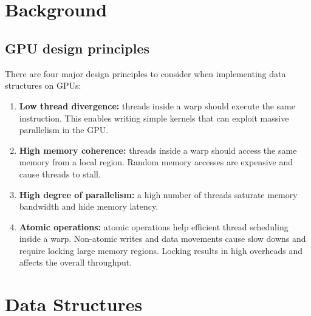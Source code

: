 \\
\\


\section{Background}


\subsection{GPU design principles}
There are four major design principles to consider when implementing data
structures on GPUs:

\begin{enumerate}[noitemsep, leftmargin=*]
    \item \textbf{Low thread divergence:} threads inside a warp should execute
      the same instruction. This enables writing simple kernels that can exploit
      massive parallelism in the GPU\@.
    \item \textbf{High memory coherence:} threads inside a warp should access
      the same  memory from a local region. Random memory accesses are expensive
      and cause threads to stall.
    \item \textbf{High degree of parallelism:} a high number of threads saturate
      memory bandwidth and hide memory latency.
    \item \textbf{Atomic operations:} atomic operations help efficient thread
      scheduling inside a warp. Non-atomic writes and data movements cause slow
      downs and require locking large memory regions. Locking results in high
      overheads and affects the overall throughput.
    \end{enumerate}


\section{Data Structures}


